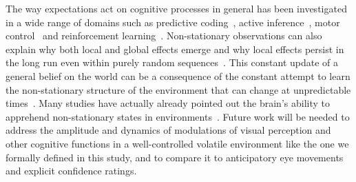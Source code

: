 \documentclass[12pt,english]{article}%
\newcommand{\citep}[1]{\parencite{#1}}
\newcommand{\AM}[1]{\textbf{\textcolor{blue}{[AM: #1]}}}
\begin{document}
The way expectations act on cognitive processes in general has been investigated in a wide range of domains such as predictive coding~\citep{Wacongne2012}, active inference~\citep{Friston2010}, motor control~\citep{WolpertGhahramani2000} and reinforcement learning~\citep{Behrens07,Wilson13,Damasse18}. Non-stationary observations can also explain why both local and global effects emerge and why local effects persist in the long run even within purely random sequences~\citep{Cho2002, Yu2009}. This constant update of a general belief on the world can be a consequence of the constant attempt to learn the non-stationary structure of the environment that can change at unpredictable times~\citep{Yu2009}. Many studies have actually already pointed out the brain's ability to apprehend non-stationary states in environments~\citep{Ossmy2013, Meyniel15}.
Future work will be needed to address the amplitude and dynamics of modulations of visual perception and other cognitive functions in a well-controlled volatile environment like the one we formally defined in this study, and to compare it to anticipatory eye movements and explicit confidence ratings.
\end{document}
